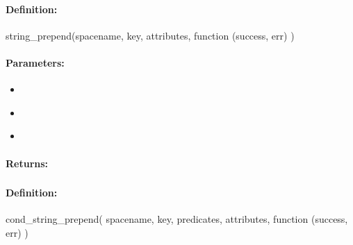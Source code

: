 \paragraph{Definition:}
\begin{javascriptcode}
string_prepend(spacename, key, attributes, function (success, err) {})
\end{javascriptcode}
\paragraph{Parameters:}
\begin{itemize}[noitemsep]
\item {}\\

\item {}\\

\item {}\\

\end{itemize}

\paragraph{Returns:}


\pagebreak
\subsubsection{}
\label{api:nodejs:cond_string_prepend}


\paragraph{Definition:}
\begin{javascriptcode}
cond_string_prepend(
        spacename, key, predicates, attributes, function (success, err) {})
\end{javascriptcode}
